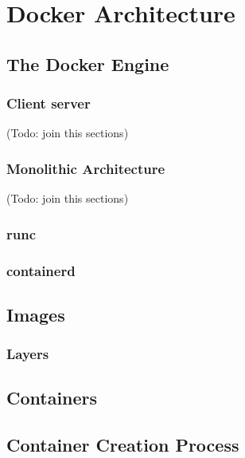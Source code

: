 \section{Docker Architecture}
\label{sec::arch}


\subsection{The Docker Engine}
\label{sec::arch:engine}
\subsubsection{Client server} (Todo: join this sections)
\subsubsection{Monolithic Architecture} (Todo: join this sections)
\subsubsection{runc}
\subsubsection{containerd}

\subsection{Images}
\label{sec::arch:images}
\subsubsection{Layers}

\subsection{Containers}
\label{sec::arch:containers}

\subsection{Container Creation Process}
\label{sec::arch:cont-creation}
